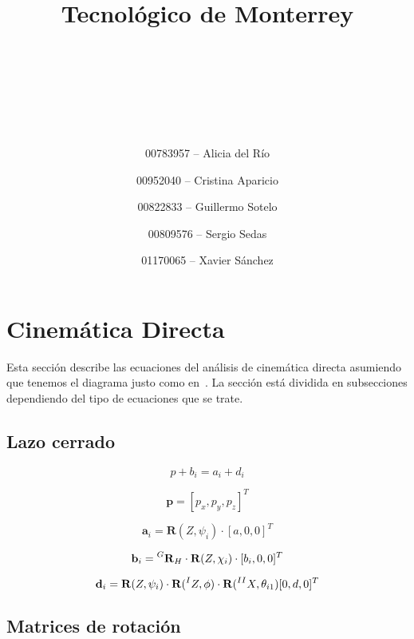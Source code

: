 \documentclass[titlepage, letterpaper, fleqn]{article}
\title{
\vspace{1in}
\textbf{Tecnológico de Monterrey} \\
\vspace{0.5in}
\textmd{\mahclass} \\
\large{\textit{\mahteacher}} \\
\vspace{0.5in}
\textsc{\mahtitle}\\
\author{00783957 -- Alicia del Río \\
\and 00952040 -- Cristina Aparicio \\
\and 00822833 -- Guillermo Sotelo \\
\and 00809576 -- Sergio Sedas \\
\and 01170065 -- Xavier Sánchez}
\date{\mahdate}
}
\let\bs\mathbf
\begin{document}
\begin{titlepage}
\maketitle
\end{titlepage}

%
%

\section{Cinemática Directa} %
\label{sec:forward}

Esta sección describe las ecuaciones del análisis de cinemática directa asumiendo que tenemos el diagrama justo como en~\cite{Rodriguez-Leal2011}.
La sección está dividida en subsecciones dependiendo del tipo de ecuaciones que se trate.

\subsection{Lazo cerrado} %
\label{subsec:loop_closure}


\begin{equation}
    \label{eq:loop_closure}
    p+b_i = a_i + d_i
\end{equation}

\begin{equation}
    \label{eq:p_vector}
    \bs{p} = [p_x,p_y,p_z]^T
\end{equation}

\begin{equation}
    \label{eq:a_vector}
    \bs{a}_i = \bs{R}(Z,\psi_i) \cdot [a,0,0]^T
\end{equation}

\begin{equation}
    \label{eq:b_vector}
    \bs{b}_i = \prescript{G}{}{\bs{R}}_H \cdot \bs{R}(Z,\chi_i) \cdot [b_i, 0, 0]^T
\end{equation}

\begin{equation}
    \label{eq:d_vector}
    \bs{d}_i = \bs{R}(Z,\psi_i) \cdot \bs{R}(\prescript{I}{}{Z},\phi) \cdot \bs{R}(\prescript{II}{}{X}, \theta_{i1})[0,d,0]^T
\end{equation}

\subsection{Matrices de rotación} %
\label{subsec:rotations}
\end{document}
